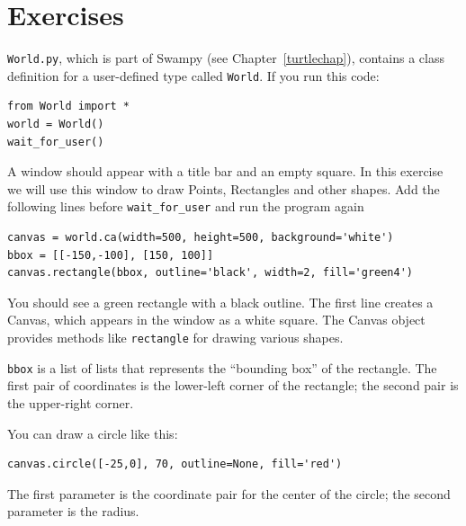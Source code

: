 \documentclass[10pt]{book}
\begin{document}
\section{Exercises}

\begin{ex}
\label{canvas}


{\tt World.py}, which is part of Swampy (see Chapter~\ref{turtlechap}),
contains a class definition for a user-defined type called 
{\tt World}.  If you run this code:

\beforeverb
\begin{verbatim}
from World import *
world = World()
wait_for_user()
\end{verbatim}
\afterverb

A window should appear with a title bar and an empty square.
In this exercise we will use this window to draw Points,
Rectangles and other shapes.  
Add the following lines before
\verb"wait_for_user" and run the program again


\beforeverb
\begin{verbatim}
canvas = world.ca(width=500, height=500, background='white')
bbox = [[-150,-100], [150, 100]]
canvas.rectangle(bbox, outline='black', width=2, fill='green4')
\end{verbatim}
\afterverb

You should see a green rectangle with a black outline.
The first line creates a Canvas, which appears in the window
as a white square.  The Canvas object provides methods like
{\tt rectangle} for drawing various shapes.


{\tt bbox} is a list of lists that represents the ``bounding box''
of the rectangle.  The first pair of coordinates is the lower-left
corner of the rectangle; the second pair is the upper-right corner.

You can draw a circle like this:

\beforeverb
\begin{verbatim}
canvas.circle([-25,0], 70, outline=None, fill='red')
\end{verbatim}
\afterverb


The first parameter is the coordinate pair for the center of the
circle; the second parameter is the radius.


\end{ex}
\end{document}
